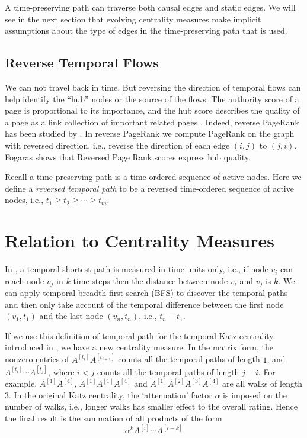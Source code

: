 \documentclass[12pt]{article}
\theoremstyle{definition}
\begin{document}
A time-preserving path can traverse both causal edges and static edges.
We will see in the next section that evolving centrality measures make implicit assumptions about the type of edges in the
time-preserving path that is used.


\subsection{Reverse Temporal Flows}
\label{sec:reverse-temp-flows}

We can not travel back in time. But reversing the direction of temporal flows can help
identify the ``hub'' nodes or the source of the flows. The authority score of a page is
proportional to its importance, and the hub score describes the quality of a page as a link collection of important related pages \cite{kleinberg99}.
Indeed, reverse PageRank has
been studied by \cite{bar08, fogaras03, gleich15}. In reverse PageRank we compute PageRank on the graph with reversed direction, i.e., reverse the direction of each edge $(i,j)$ to $(j, i)$.
Fogaras \cite{fogaras03} shows that Reversed Page Rank scores express hub quality.


Recall a time-preserving path is a time-ordered sequence of active nodes. Here we define a \emph{reversed temporal path} to be a reversed time-ordered sequence of active nodes, i.e.,
$t_1 \ge t_2 \ge \cdots \ge t_m$.


\section{Relation to Centrality Measures}
\label{sec:topol-temp-flow}

In \cite{tang10s}, a temporal shortest path is measured in time units only, i.e., if node
$v_i$ can reach node $v_j$ in $k$ time steps then the distance between node
$v_i$ and $v_j$ is $k$. We can apply temporal breadth first
search (BFS) \cite{chen16} to discover the temporal paths and then only take account of the temporal difference between the first node $(v_1, t_1)$ and the last node $(v_n, t_n)$, i.e., $t_n - t_1$.

If we use this definition of temporal path for the temporal Katz centrality introduced in
\cite{grindrod11}, we have a new centrality measure.
In the matrix form, the nonzero entries of $A^{[t_i]} A^{[t_{i+1}]}$ counts all the temporal paths of length $1$, and
$A^{[t_i]}\cdots A^{[t_j]}$, where $i < j$ counts all the temporal paths of length $j -i$.
For example, $A^{[1]}A^{[4]}$, $A^{[1]}A^{[1]}A^{[4]}$ and $A^{[1]}A^{[2]}A^{[3]}A^{[4]}$ are all walks of length 3.
In the original Katz centrality, the `attenuation' factor $\alpha$ is imposed on the
number of walks, i.e., longer walks has smaller effect to the overall rating.
Hence the final result is the summation of all products of the form
\[
\alpha^k A^{[i]} \cdots A^{[i+k]}
\]
\end{document}

